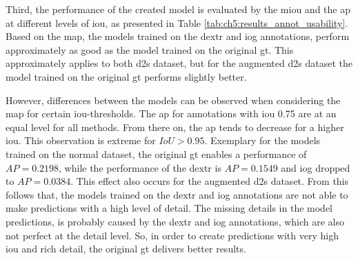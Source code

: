 Third, the performance of the created model is evaluated by the \gls{miou} and the \gls{ap} at different levels of \gls{iou}, as presented in Table \ref{tab:ch5:results_annot_usability}.
Based on the \gls{map}, the models trained on the \gls{dextr} and \gls{iog} annotations, perform approximately as good as the model trained on the original \gls{gt}.
This approximately applies to both \gls{d2s} dataset, but for the augmented \gls{d2s} dataset the model trained on the original \gls{gt} performs slightly better.

However, differences between the models can be observed when considering the \gls{map} for certain \gls{iou}-thresholds.
The \gls{ap} for annotations with \gls{iou} 0.75 are at an equal level for all methods.
From there on, the \gls{ap} tends to decrease for a higher \gls{iou}.
This observation is extreme for $ IoU > 0.95 $. 
Exemplary for the models trained on the normal dataset, the original \gls{gt} enables a performance of $ AP = 0.2198 $, while the performance of the \gls{dextr} is $ AP = 0.1549 $ and \gls{iog} dropped to $ AP = 0.0384 $.
This effect also occurs for the augmented \gls{d2s} dataset.
From this follows that, the models trained on the \gls{dextr} and \gls{iog} annotations are not able to make predictions with a high level of detail.
The missing details in the model predictions, is probably caused by the \gls{dextr} and \gls{iog} annotations, which are also not perfect at the detail level.
So, in order to create predictions with very high \gls{iou} and rich detail, the original \gls{gt} delivers better results.

